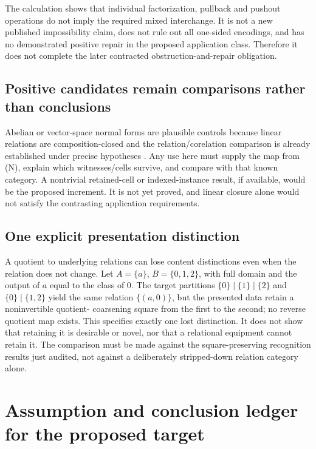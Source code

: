 \documentclass[11pt,a4paper]{article}
\begin{document}
The calculation shows that individual factorization, pullback and pushout
operations do not imply the required mixed interchange. It is not a new
published impossibility claim, does not rule out all one-sided encodings, and
has no demonstrated positive repair in the proposed application class. Therefore
it does not complete the later contracted obstruction-and-repair obligation.

\subsection{Positive candidates remain comparisons rather than conclusions}

Abelian or vector-space normal forms are plausible controls because linear
relations are composition-closed and the relation/corelation comparison is
already established under precise hypotheses \cite{FZ}. Any use here must
supply the map from (N), explain which witnesses/cells survive, and compare with
that known category. A nontrivial retained-cell or indexed-instance result, if
available, would be the proposed increment. It is not yet proved, and linear
closure alone would not satisfy the contrasting application requirements.

\subsection{One explicit presentation distinction}

A quotient to underlying relations can lose content distinctions even when the
relation does not change. Let \(A=\{a\}\), \(B=\{0,1,2\}\), with full domain
and the output of \(a\) equal to the class of \(0\). The target partitions
\(\{0\}\mid\{1\}\mid\{2\}\) and \(\{0\}\mid\{1,2\}\) yield the same
relation \(\{(a,0)\}\), but the presented data retain a noninvertible quotient-
coarsening square from the first to the second; no reverse quotient map exists.
This specifies exactly one lost distinction. It does not show that retaining it
is desirable or novel, nor that a relational equipment cannot retain it.
The comparison must be made against the square-preserving recognition results
just audited, not against a deliberately stripped-down relation category alone.

\section{Assumption and conclusion ledger for the proposed target}
\end{document}
